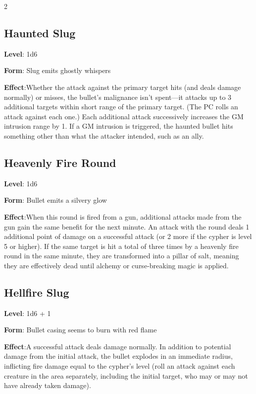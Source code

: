 \begin{multicols}{2}
\subsection{Haunted Slug}

\textbf{Level}: 1d6 

\textbf{Form}: Slug emits ghostly whispers 

\textbf{Effect}:Whether the attack against the primary target hits (and deals damage normally) or misses, the bullet’s malignance isn’t spent—it attacks up to 3 additional targets within short range of the primary target. (The PC rolls an attack against each one.) Each additional attack successively increases the GM intrusion range by 1. If a GM intrusion is triggered, the haunted bullet hits something other than what the attacker intended, such as an ally.

\subsection{Heavenly Fire Round}

\textbf{Level}: 1d6

\textbf{Form}: Bullet emits a silvery glow

\textbf{Effect}:When this round is fired from a gun, additional attacks made from the gun gain the same benefit for the next minute. An attack with the round deals 1 additional point of damage on a successful attack (or 2 more if the cypher is level 5 or higher). If the same target is hit a total of three times by a heavenly fire round in the same minute, they are transformed into a pillar of salt, meaning they are effectively dead until alchemy or curse‑breaking magic is applied.

\subsection{Hellfire Slug}

\textbf{Level}: 1d6 + 1 

\textbf{Form}: Bullet casing seems to burn with red flame 

\textbf{Effect}:A successful attack deals damage normally. In addition to potential damage from the initial attack, the bullet explodes in an immediate radius, inflicting fire damage equal to the cypher’s level (roll an attack against each creature in the area separately, including the initial target, who may or may not have already taken damage). 


\end{multicols}
